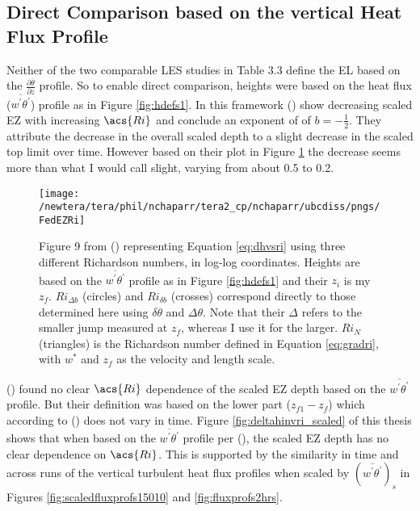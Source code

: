 \subsection{Direct Comparison based on the vertical Heat Flux Profile}

Neither of the two comparable \acs{LES} studies in Table 3.3 define the \acs{EL} based on the $\frac{\partial \overline{\theta}}{\partial z}$ profile.  So to enable direct comparison, heights were based on the heat flux ($\overline{w^{'}\theta^{'}}$) profile as in Figure \ref{fig:hdefs1}.  In this framework \citeauthor{FedConzMir04} (\citeyear{FedConzMir04}) show decreasing scaled \acs{EZ} with increasing $\acs{Ri}$ and conclude an exponent of of $b = -\frac{1}{2}$.  They attribute the decrease in the overall scaled depth to a slight decrease in the scaled top limit over time.  However based on their plot in Figure \ref{fig:FedEZRi} the decrease seems more than what I would call slight, varying from about 0.5 to 0.2.\\

\begin{figure}[htbp]
    \centering
    \texttt{[image: /newtera/tera/phil/nchaparr/tera2\_cp/nchaparr/ubcdiss/pngs/FedEZRi]}
    \caption[Plot of the relationship between scaled \acs{EZ} depth and Richardson number from \citeauthor{FedConzMir04}'s (\citeyear{FedConzMir04})]{Figure 9 from \citeauthor{FedConzMir04} (\citeyear{FedConzMir04}) representing Equation \ref{eq:dhvsri} using three different Richardson numbers, in log-log coordinates.  Heights are based on the $\overline{w^{'}\theta^{'}}$ profile as in Figure \ref{fig:hdefs1} and their $z_{i}$ is my $z_{f}$. $Ri_{\Delta b}$ (circles) and $Ri_{\delta b}$ (crosses) correspond directly to those determined here using $\delta \theta$ and $\Delta \theta$.  Note that their $\Delta$ refers to the smaller jump measured at $z_{f}$, whereas I use it for the larger.  $Ri_{N}$ (triangles) is the Richardson number defined in Equation \ref{eq:gradri}, with $w^{*}$ and $z_{f}$ as the velocity and length scale.}
    \label{fig:FedEZRi}   %
\end{figure}


 \citeauthor{BrooksFowler2} (\citeyear{BrooksFowler2}) found no clear $\acs{Ri}$ dependence of the scaled \acs{EZ} depth based on the $\overline{w^{'}\theta^{'}}$ profile.  But their definition was based on the lower part ($z_{f1} - z_{f}$) which according to \citeauthor{FedConzMir04} (\citeyear{FedConzMir04}) does not vary in time.  Figure \ref{fig:deltahinvri_scaled} of this thesis shows that when based on the $\overline{w^{'}\theta^{'}}$ profile per \citeauthor{FedConzMir04} (\citeyear{FedConzMir04}), the scaled \acs{EZ} depth has no clear dependence on $\acs{Ri}$. This is supported by the similarity in time and across runs of the vertical turbulent heat flux profiles when scaled by $(\overline{w^{'}\theta^{'}})_{s}$ in Figures \ref{fig:scaledfluxprofs15010} and \ref{fig:fluxprofs2hrs}.\\

